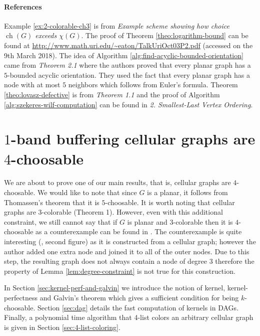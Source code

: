 \documentclass[a4paper, 12pt]{article}
\DeclareMathOperator*{\ch}{ch}
\begin{document}
\paragraph*{References} Example \ref{ex:2-colorable-ch3} is from \cite{erdos-choosability} \textit{Example scheme showing how choice $\ch(G)$ exceeds $\chi(G)$}. The proof of Theorem \ref{theo:logarithm-bound} can be found at \url{http://www.math.uri.edu/~eaton/TalkUriOct03P2.pdf} (accessed on the 9th March 2018). The idea of Algorithm \ref{alg:find-acyclic-bounded-orientation} came from \cite{CHROBAK1991243} \textit{Theorem 2.1} where the authors proved that every planar graph has a $5$-bounded acyclic orientation. They used the fact that every planar graph has a node with at most $5$ neighbors which follows from Euler's formula. Theorem \ref{theo:lovasz-defective} is from \cite{Cowen:1997:CD:314161.314387} \textit{Theorem 1.1} and the proof of Algorithm \ref{alg:szekeres-wilf-computation} can be found in \cite{Matula:1983:SOC:2402.322385} \textit{2. Smallest-Last Vertex Ordering}.

\section{$1$-band buffering cellular graphs are $4$-choosable}\label{sec:4-choosable}
We are about to prove one of our main results, that is, cellular graphs are $4$-choosable. We would like to note that since $G$ is a planar, it follows from Thomassen's theorem \cite{Thomassen:1994:PG:184180.184192} that it is $5$-choosable. It is worth noting that cellular graphs are $3$-colorable \cite{662943} (Theorem 1). However, even with this additional constraint, we still cannot say that if $G$ is planar and $3$-colorable then it is $4$-choosable as a counterexample can be found in \cite{JGT:JGT4}. The counterexample is quite interesting (\cite {JGT:JGT4}, second figure) as it is constructed from a cellular graph; however the author added one extra node and joined it to all of the outer nodes. Due to this step, the resulting graph does not always contain a node of degree $3$ therefore the property of Lemma \ref{lem:degree-constraint} is not true for this construction.

In Section \ref{sec:kernel-perf-and-galvin} we introduce the notion of kernel, kernel-perfectness and Galvin's theorem which gives a sufficient condition for being $k$-choosable. Section \ref{sec:dag} details the fast computation of kernels in DAGs. Finally, a polynomial time algorithm that 4-list colors an arbitrary cellular graph is given in Section \ref{sec:4-list-coloring}.
\end{document}
